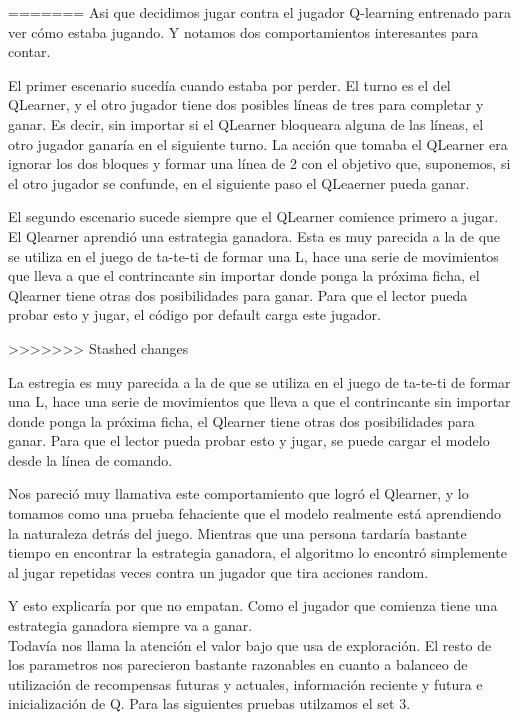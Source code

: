 =======
Asi que decidimos jugar contra el jugador Q-learning entrenado para ver c\'omo estaba jugando. Y notamos dos comportamientos interesantes para contar.

El primer escenario suced\'ia cuando estaba por perder. El turno es el del QLearner, y el otro jugador tiene dos posibles l\'ineas de tres para completar y ganar. Es decir, sin importar si el QLearner bloqueara alguna de las l\'ineas, el otro jugador ganar\'ia en el siguiente turno. La acci\'on que tomaba el QLearner era ignorar los dos bloques y formar una l\'inea de 2 con el objetivo que, suponemos, si el otro jugador se confunde, en el siguiente paso el QLeaerner pueda ganar.  

El segundo escenario sucede siempre que el QLearner comience primero a jugar. El Qlearner aprendi\'o una estrategia ganadora. Esta es muy parecida a la de que se utiliza en el juego de ta-te-ti de formar una L, hace una serie de movimientos que lleva a que el contrincante sin importar donde ponga la pr\'oxima ficha, el Qlearner tiene otras dos posibilidades para ganar. Para que el lector pueda probar esto y jugar, el c\'odigo por default carga este jugador.

>>>>>>> Stashed changes


La estregia es muy parecida a la de que se utiliza en el juego de ta-te-ti de formar una L, hace una serie de movimientos que lleva a que el contrincante sin importar donde ponga la pr\'oxima ficha, el Qlearner tiene otras dos posibilidades para ganar. Para que el lector pueda probar esto y jugar, se puede cargar el modelo desde la l\'inea de comando.

Nos pareci\'o muy llamativa este comportamiento que logr\'o el Qlearner, y lo tomamos como una prueba fehaciente que el modelo realmente est\'a aprendiendo la naturaleza detr\'as del juego. Mientras que una persona tardar\'ia bastante tiempo en encontrar la estrategia ganadora, el algoritmo lo encontr\'o simplemente al jugar repetidas veces contra un jugador que tira acciones random.

Y esto explicaría por que no empatan. Como el jugador que comienza tiene una estrategia ganadora siempre va a ganar.\\

Todavía nos llama la atención el valor bajo que usa de exploración. El resto de los parametros nos parecieron bastante razonables en cuanto a balanceo de utilización de recompensas futuras y actuales, información reciente y futura e inicialización de Q.
Para las siguientes pruebas utilzamos el set 3.\\

